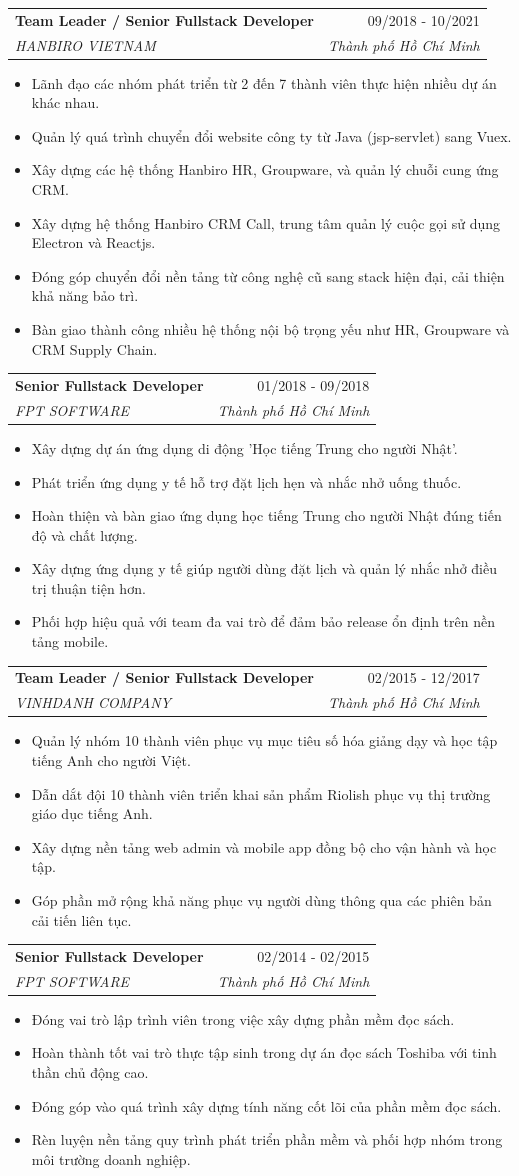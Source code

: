 \documentclass[letterpaper,11pt]{article}
\makeatletter
\newcommand{\resumeItem}[1]{
  \item\small{
    {#1 \vspace{-2pt}}
  }
}
\newcommand{\resumeSubheading}[4]{
  \vspace{-2pt}\item
    \begin{tabular*}{0.97\textwidth}[t]{l@{\extracolsep{\fill}}r}
      \textbf{#1} & #2 \\
      \textit{\small#3} & \textit{\small #4} \\
    \end{tabular*}\vspace{-7pt}
}
\newcommand{\resumeItemListStart}{\begin{itemize}}
\newcommand{\resumeItemListEnd}{\end{itemize}\vspace{-5pt}}
\makeatother
\begin{document}
    \resumeSubheading
      {Team Leader / Senior Fullstack Developer}{09/2018 - 10/2021}
      {HANBIRO VIETNAM}{Thành phố Hồ Chí Minh}
      \resumeItemListStart
        \resumeItem{Lãnh đạo các nhóm phát triển từ 2 đến 7 thành viên thực hiện nhiều dự án khác nhau.}
        \resumeItem{Quản lý quá trình chuyển đổi website công ty từ Java (jsp-servlet) sang Vuex.}
        \resumeItem{Xây dựng các hệ thống Hanbiro HR, Groupware, và quản lý chuỗi cung ứng CRM.}
        \resumeItem{Xây dựng hệ thống Hanbiro CRM Call, trung tâm quản lý cuộc gọi sử dụng Electron và Reactjs.}
        \resumeItem{Đóng góp chuyển đổi nền tảng từ công nghệ cũ sang stack hiện đại, cải thiện khả năng bảo trì.}
        \resumeItem{Bàn giao thành công nhiều hệ thống nội bộ trọng yếu như HR, Groupware và CRM Supply Chain.}
      \resumeItemListEnd

    \resumeSubheading
      {Senior Fullstack Developer}{01/2018 - 09/2018}
      {FPT SOFTWARE}{Thành phố Hồ Chí Minh}
      \resumeItemListStart
        \resumeItem{Xây dựng dự án ứng dụng di động 'Học tiếng Trung cho người Nhật'.}
        \resumeItem{Phát triển ứng dụng y tế hỗ trợ đặt lịch hẹn và nhắc nhở uống thuốc.}
        \resumeItem{Hoàn thiện và bàn giao ứng dụng học tiếng Trung cho người Nhật đúng tiến độ và chất lượng.}
        \resumeItem{Xây dựng ứng dụng y tế giúp người dùng đặt lịch và quản lý nhắc nhở điều trị thuận tiện hơn.}
        \resumeItem{Phối hợp hiệu quả với team đa vai trò để đảm bảo release ổn định trên nền tảng mobile.}
      \resumeItemListEnd

    \resumeSubheading
      {Team Leader / Senior Fullstack Developer}{02/2015 - 12/2017}
      {VINHDANH COMPANY}{Thành phố Hồ Chí Minh}
      \resumeItemListStart
        \resumeItem{Quản lý nhóm 10 thành viên phục vụ mục tiêu số hóa giảng dạy và học tập tiếng Anh cho người Việt.}
        \resumeItem{Dẫn dắt đội 10 thành viên triển khai sản phẩm Riolish phục vụ thị trường giáo dục tiếng Anh.}
        \resumeItem{Xây dựng nền tảng web admin và mobile app đồng bộ cho vận hành và học tập.}
        \resumeItem{Góp phần mở rộng khả năng phục vụ người dùng thông qua các phiên bản cải tiến liên tục.}
      \resumeItemListEnd

    \resumeSubheading
      {Senior Fullstack Developer}{02/2014 - 02/2015}
      {FPT SOFTWARE}{Thành phố Hồ Chí Minh}
      \resumeItemListStart
        \resumeItem{Đóng vai trò lập trình viên trong việc xây dựng phần mềm đọc sách.}
        \resumeItem{Hoàn thành tốt vai trò thực tập sinh trong dự án đọc sách Toshiba với tinh thần chủ động cao.}
        \resumeItem{Đóng góp vào quá trình xây dựng tính năng cốt lõi của phần mềm đọc sách.}
        \resumeItem{Rèn luyện nền tảng quy trình phát triển phần mềm và phối hợp nhóm trong môi trường doanh nghiệp.}
      \resumeItemListEnd
\end{document}
